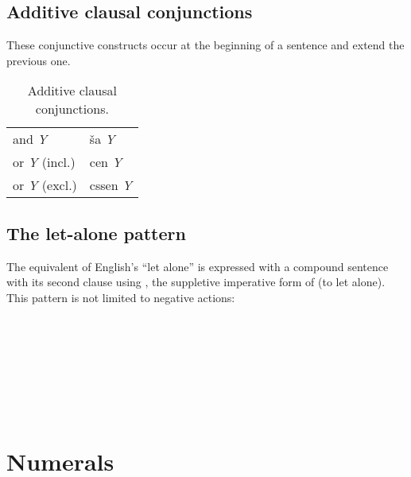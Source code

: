 \documentclass{book}
\begin{document}
\section{Additive clausal conjunctions}

These conjunctive constructs occur at the beginning of a sentence and extend the previous one.

\begin{table}[ht]
  \caption{Additive clausal conjunctions.}
  \centering
	\begin{tabular}{|l|l|}
	  \hline
	  and \emph{Y} & ša \emph{Y} \\
	  or \emph{Y} (incl.) & cen \emph{Y} \\
	  or \emph{Y} (excl.) & cssen \emph{Y} \\ \hline
	\end{tabular}
\end{table}

\section{The let-alone pattern}

The equivalent of English's ``let alone'' is expressed with a compound sentence with its second clause using , the suppletive imperative form of  (to let alone). This pattern is not limited to negative actions: \\
~\\
       \\
       \\
       \\
~\\
     \\
     \\
    

\chapter{Numerals}
\end{document}
